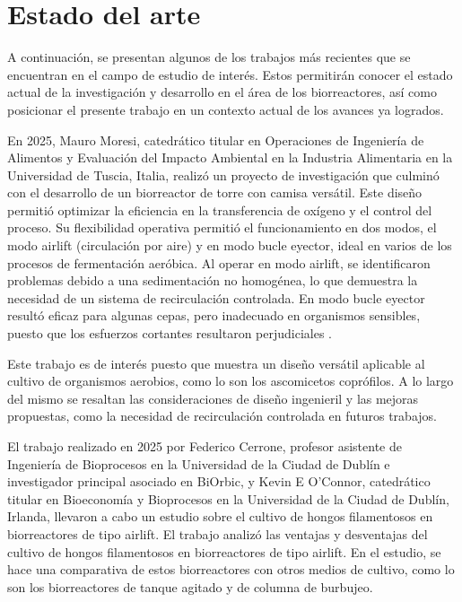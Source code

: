 \chapter{Estado del arte}\label{cap5}

A continuación, se presentan algunos de los trabajos más recientes que se
encuentran en el campo de estudio de interés. Estos permitirán conocer el estado
actual de la investigación y desarrollo en el área de los biorreactores, así como
posicionar el presente trabajo en un contexto actual de los avances ya logrados.

En 2025, Mauro Moresi, catedrático titular en Operaciones de Ingeniería de
Alimentos y Evaluación del Impacto Ambiental en la Industria Alimentaria en la
Universidad de Tuscia, Italia, realizó un proyecto de investigación que culminó con
el desarrollo de un biorreactor de torre con camisa versátil. Este diseño permitió
optimizar la eficiencia en la transferencia de oxígeno y el control del proceso. Su
flexibilidad operativa permitió el funcionamiento en dos modos, el modo airlift
(circulación por aire) y en modo bucle eyector, ideal en varios de los procesos de
fermentación aeróbica. Al operar en modo airlift, se identificaron problemas debido
a una sedimentación no homogénea, lo que demuestra la necesidad de un sistema
de recirculación controlada. En modo bucle eyector resultó eficaz para algunas
cepas, pero inadecuado en organismos sensibles, puesto que los esfuerzos
cortantes resultaron perjudiciales \cite{Moresi2025}.

Este trabajo es de interés puesto que muestra un diseño versátil aplicable al cultivo
de organismos aerobios, como lo son los ascomicetos coprófilos. A lo largo del
mismo se resaltan las consideraciones de diseño ingenieril y las mejoras
propuestas, como la necesidad de recirculación controlada en futuros trabajos.

El trabajo realizado en 2025 por Federico Cerrone, profesor asistente de Ingeniería
de Bioprocesos en la Universidad de la Ciudad de Dublín e investigador principal
asociado en BiOrbic, y Kevin E O'Connor, catedrático titular en Bioeconomía y
Bioprocesos en la Universidad de la Ciudad de Dublín, Irlanda, llevaron a cabo un
estudio sobre el cultivo de hongos filamentosos en biorreactores de tipo airlift. El
trabajo analizó las ventajas y desventajas del cultivo de hongos filamentosos en
biorreactores de tipo airlift. En el estudio, se hace una comparativa de estos
biorreactores con otros medios de cultivo, como lo son los biorreactores de tanque
agitado y de columna de burbujeo.

